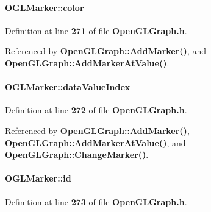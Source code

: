 \paragraph[{color}]{ O\+G\+L\+Marker\+::color}\label{structOGLMarker_a0f1cfbbf4e340a4511c1cb6e84a24a1b}


Definition at line {\bf 271} of file {\bf Open\+G\+L\+Graph.\+h}.



Referenced by {\bf Open\+G\+L\+Graph\+::\+Add\+Marker()}, and {\bf Open\+G\+L\+Graph\+::\+Add\+Marker\+At\+Value()}.

\paragraph[{data\+Value\+Index}]{ O\+G\+L\+Marker\+::data\+Value\+Index}\label{structOGLMarker_ab8b6b8e6ce2b294a5b38e2b96a0d0a00}


Definition at line {\bf 272} of file {\bf Open\+G\+L\+Graph.\+h}.



Referenced by {\bf Open\+G\+L\+Graph\+::\+Add\+Marker()}, {\bf Open\+G\+L\+Graph\+::\+Add\+Marker\+At\+Value()}, and {\bf Open\+G\+L\+Graph\+::\+Change\+Marker()}.

\paragraph[{id}]{ O\+G\+L\+Marker\+::id}\label{structOGLMarker_a449501c3299f00d0bcbe0fa808794afd}


Definition at line {\bf 273} of file {\bf Open\+G\+L\+Graph.\+h}.



